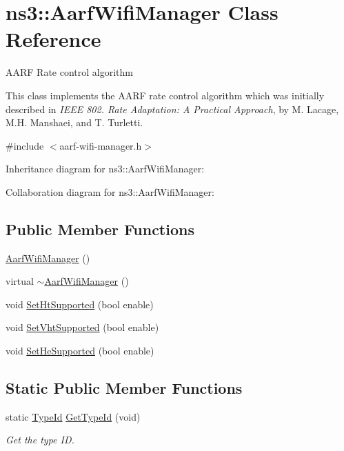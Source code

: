 \hypertarget{classns3_1_1AarfWifiManager}{}\section{ns3\+:\+:Aarf\+Wifi\+Manager Class Reference}
\label{classns3_1_1AarfWifiManager}


A\+A\+RF Rate control algorithm

This class implements the A\+A\+RF rate control algorithm which was initially described in {\itshape I\+E\+EE 802. Rate Adaptation\+: A Practical Approach}, by M. Lacage, M.\+H. Manshaei, and T. Turletti.  




{\ttfamily \#include $<$aarf-\/wifi-\/manager.\+h$>$}



Inheritance diagram for ns3\+:\+:Aarf\+Wifi\+Manager\+:


Collaboration diagram for ns3\+:\+:Aarf\+Wifi\+Manager\+:
\subsection*{Public Member Functions}
\begin{DoxyCompactItemize}
\item 
\hyperlink{classns3_1_1AarfWifiManager_acbc4c0951d544f273a1180e757962189}{Aarf\+Wifi\+Manager} ()
\item 
virtual \hyperlink{classns3_1_1AarfWifiManager_a0982507e2692827867d60f209805e388}{$\sim$\+Aarf\+Wifi\+Manager} ()
\item 
void \hyperlink{classns3_1_1AarfWifiManager_a7ecfc86b1574eb90197b54aaec17e5e2}{Set\+Ht\+Supported} (bool enable)
\item 
void \hyperlink{classns3_1_1AarfWifiManager_a72edc7a081c8f2ea4bfe64ab60b1847c}{Set\+Vht\+Supported} (bool enable)
\item 
void \hyperlink{classns3_1_1AarfWifiManager_ac6bfb5fd25b40f25103293e8fbf2b9b2}{Set\+He\+Supported} (bool enable)
\end{DoxyCompactItemize}
\subsection*{Static Public Member Functions}
\begin{DoxyCompactItemize}
\item 
static \hyperlink{classns3_1_1TypeId}{Type\+Id} \hyperlink{classns3_1_1AarfWifiManager_a7113324dbe9fb238838fa464ccb2d6ce}{Get\+Type\+Id} (void)
\begin{DoxyCompactList}\small\item\em Get the type ID. \end{DoxyCompactList}\end{DoxyCompactItemize}
